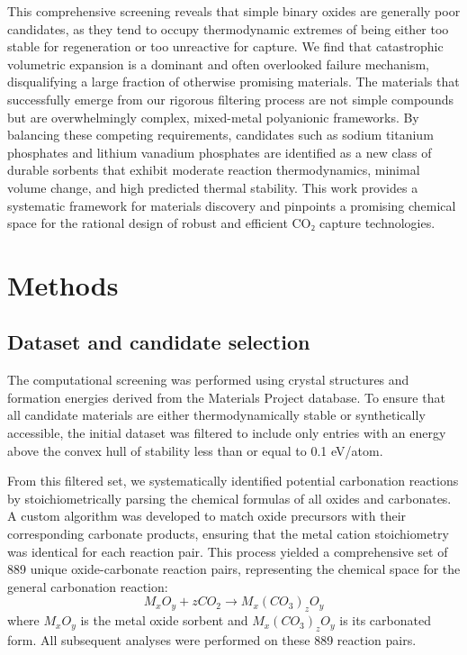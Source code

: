 \documentclass[]{article}
\begin{document}
This comprehensive screening reveals that simple binary oxides are generally poor candidates, as they tend to occupy thermodynamic extremes of being either too stable for regeneration or too unreactive for capture. We find that catastrophic volumetric expansion is a dominant and often overlooked failure mechanism, disqualifying a large fraction of otherwise promising materials. The materials that successfully emerge from our rigorous filtering process are not simple compounds but are overwhelmingly complex, mixed-metal polyanionic frameworks. By balancing these competing requirements, candidates such as sodium titanium phosphates and lithium vanadium phosphates are identified as a new class of durable sorbents that exhibit moderate reaction thermodynamics, minimal volume change, and high predicted thermal stability. This work provides a systematic framework for materials discovery and pinpoints a promising chemical space for the rational design of robust and efficient CO₂ capture technologies.

\section{Methods}
\label{sec:methods}
\subsection{Dataset and candidate selection}
The computational screening was performed using crystal structures and formation energies derived from the Materials Project database. To ensure that all candidate materials are either thermodynamically stable or synthetically accessible, the initial dataset was filtered to include only entries with an energy above the convex hull of stability less than or equal to 0.1 eV/atom. 

From this filtered set, we systematically identified potential carbonation reactions by stoichiometrically parsing the chemical formulas of all oxides and carbonates. A custom algorithm was developed to match oxide precursors with their corresponding carbonate products, ensuring that the metal cation stoichiometry was identical for each reaction pair. This process yielded a comprehensive set of 889 unique oxide-carbonate reaction pairs, representing the chemical space for the general carbonation reaction:
\begin{equation}
    M_xO_y + zCO_2 \rightarrow M_x(CO_3)_zO_y
\end{equation}
where $M_xO_y$ is the metal oxide sorbent and $M_x(CO_3)_zO_y$ is its carbonated form. All subsequent analyses were performed on these 889 reaction pairs.
\end{document}
